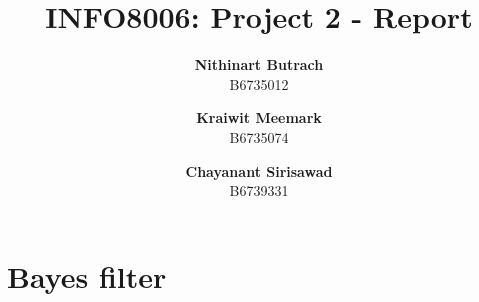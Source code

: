 \documentclass{article}
\begin{document}

\title{\Large{INFO8006: Project 2 - Report}}
\vspace{1cm}
\author{
    \small{\bf Nithinart Butrach} \\ \small{B6735012} 
    \and 
    \small{\bf Kraiwit Meemark} \\ \small{B6735074} 
    \and 
    \small{\bf Chayanant Sirisawad} \\ \small{B6739331}
}

\maketitle


\section{Bayes filter}
\end{document}
